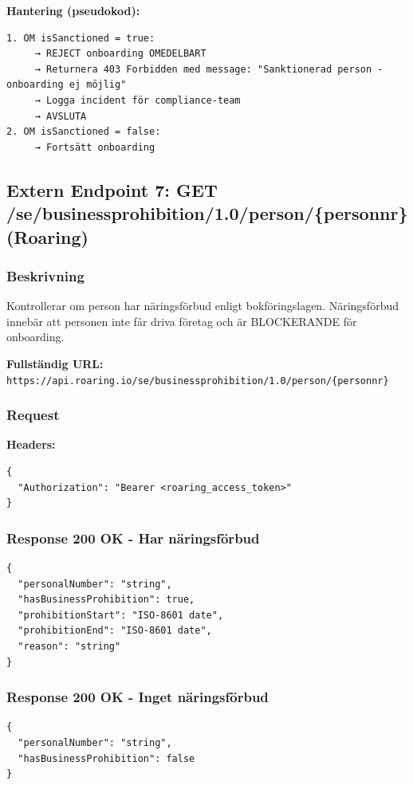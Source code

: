 \documentclass[12pt,a4paper]{article}
\begin{document}
\textbf{Hantering (pseudokod):}
\begin{lstlisting}
1. OM isSanctioned = true:
     → REJECT onboarding OMEDELBART
     → Returnera 403 Forbidden med message: "Sanktionerad person - onboarding ej möjlig"
     → Logga incident för compliance-team
     → AVSLUTA
2. OM isSanctioned = false:
     → Fortsätt onboarding
\end{lstlisting}

\subsection{Extern Endpoint 7: GET /se/businessprohibition/1.0/person/\{personnr\} (Roaring)}

\subsubsection{Beskrivning}

Kontrollerar om person har näringsförbud enligt bokföringslagen. Näringsförbud innebär att personen inte får driva företag och är BLOCKERANDE för onboarding.

\textbf{Fullständig URL:} \texttt{https://api.roaring.io/se/businessprohibition/1.0/person/\{personnr\}}

\subsubsection{Request}

\textbf{Headers:}
\begin{lstlisting}
{
  "Authorization": "Bearer <roaring_access_token>"
}
\end{lstlisting}

\subsubsection{Response 200 OK - Har näringsförbud}

\begin{lstlisting}
{
  "personalNumber": "string",
  "hasBusinessProhibition": true,
  "prohibitionStart": "ISO-8601 date",
  "prohibitionEnd": "ISO-8601 date",
  "reason": "string"
}
\end{lstlisting}

\subsubsection{Response 200 OK - Inget näringsförbud}
\begin{lstlisting}
{
  "personalNumber": "string",
  "hasBusinessProhibition": false
}
\end{lstlisting}
\end{document}
